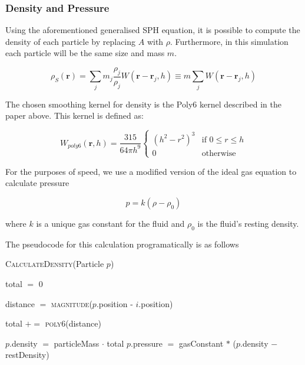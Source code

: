 \documentclass[12pt]{article}
\begin{document}
    \subsubsection{Density and Pressure}

    Using the aforementioned generalised SPH equation, it is possible to compute the density of each particle by replacing $A$ with $\rho$. Furthermore, in this simulation each particle will be the same size and mass $m$.

    \begin{equation}
        \rho_S(\textbf{r}) = \sum_{j}{m_j \frac{\rho_j}{\rho_j}W(\textbf{r} - \textbf{r}_j, h)} \equiv m\sum_{j}{W(\textbf{r} - \textbf{r}_j, h)}
    \end{equation}

    The chosen smoothing kernel for density is the Poly6 kernel described in the paper above\cite{sca}. This kernel is defined as:

    \begin{equation}
        W_{poly6}(\textbf{r}, h) = \frac{315}{64\pi{h}^9}
        \begin{cases}
            (h^2 - r^2)^3 & \text{if } 0 \leq r \leq h \\
            0 & \text{otherwise}
        \end{cases}
    \end{equation}

    For the purposes of speed, we use a modified version of the ideal gas equation to calculate pressure

    \begin{equation}
        p = k(\rho - \rho_0)
    \end{equation}

    where $k$ is a unique gas constant for the fluid and $\rho_0$ is the fluid's resting density.

    The pseudocode for this calculation programatically is as follows

    \begin{algorithm}[H]
        \caption{\textsc{CalculateDensity}(Particle $p$)}
    
        \begin{algorithmic}
            \State total $=$ 0
            
                \State distance $=$ \textsc{magnitude}($p$.position - $i$.position)

                    \State total $+=$ \textsc{poly6}(distance)
                \EndIf
            \EndFor

            \State $p$.density $=$ particleMass $\cdot$ total
            \State $p$.pressure $=$ gasConstant $*$ ($p$.density $-$ restDensity)
        \end{algorithmic}

    \end{algorithm}
\end{document}
